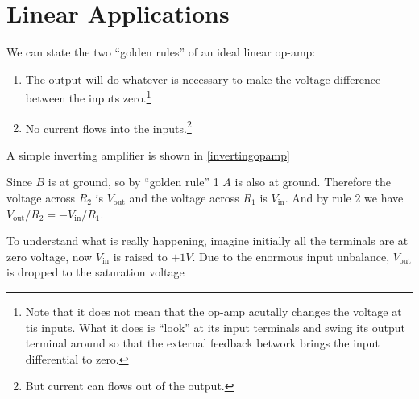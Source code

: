 \documentclass[english,a4paper,12pt]{report}
\begin{document}

\section{Linear Applications}

We can state the two ``golden rules'' of an ideal linear op-amp:

\begin{enumerate}
    \item The output will do whatever is necessary to make the voltage difference between the inputs zero.\footnote{Note that it does not mean that the op-amp acutally changes the voltage at tis inputs. What it does is ``look'' at its input terminals and swing its output terminal around so that the external feedback betwork brings the input differential to zero.}
    \item No current flows into the inputs.\footnote{But current can flows out of the output.} 
\end{enumerate}

A simple inverting amplifier is shown in \cref{invertingopamp} 


Since \(B\) is at ground, so by ``golden rule'' 1 \(A\) is also at ground. Therefore the voltage across \(R_2 \) is \(V_{\text{out}} \) and the voltage across \(R_1 \) is \(V_{\text{in}} \). And by rule 2 we have \(V_{\text{out} } /R_2 = - V_{\text{in} }/ R_1  \). 

To understand what is really happening, imagine initially all the terminals are at zero voltage, now \(V_{\text{in}} \) is raised to \(+1V\). Due to the enormous input unbalance, \(V_{\text{out}} \) is dropped to the saturation voltage  
\end{document}
